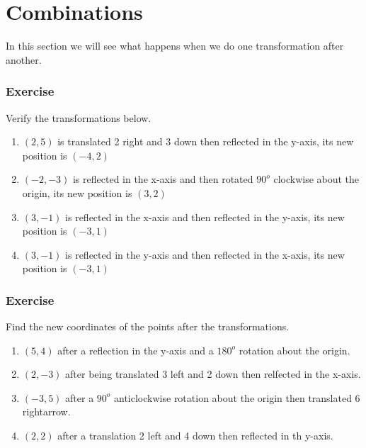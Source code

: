 \section{Combinations}
In this section we will see what happens when we do one transformation after another.
\subsubsection{Exercise}
Verify the transformations below.
\begin{enumerate}
	\item $(2, 5)$ is translated 2 right and 3 down then reflected in the y-axis, its new position is $(-4, 2)$
	\item $(-2, -3)$ is reflected in the x-axis and then rotated $90^o$ clockwise about the origin, its new position is $(3, 2)$
	\item $(3, -1)$ is reflected in the x-axis and then reflected in the y-axis, its new position is $(-3, 1)$
	\item $(3, -1)$ is reflected in the y-axis and then reflected in the x-axis, its new position is $(-3, 1)$
\end{enumerate}

\subsubsection{Exercise}
Find the new coordinates of the points after the transformations.
\begin{enumerate}
	\item $(5, 4)$ after a reflection in the y-axis and a $180^o$ rotation about the origin.
	\item $(2, -3)$ after being translated 3 left and 2 down then relfected in the x-axis.
	\item $(-3, 5)$ after a $90^o$ anticlockwise rotation about the origin then translated 6 rightarrow.
	\item $(2, 2)$ after a translation 2 left and 4 down then reflected in th y-axis.
\end{enumerate}
